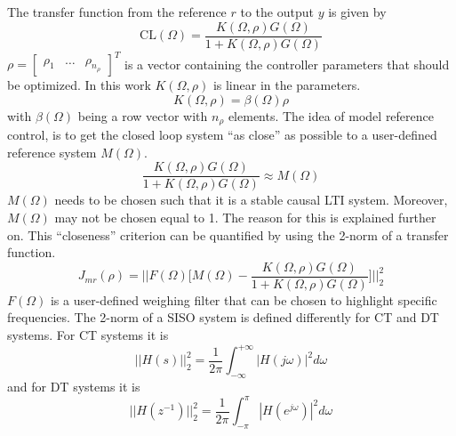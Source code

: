 The transfer function from the reference $r$ to the output $y$ is given by
\begin{equation*}
    \text{CL}(\Omega) = \frac{K(\Omega,\rho) G(\Omega)}{1 + K(\Omega,\rho) G(\Omega)}
\end{equation*}
$\rho = \begin{bmatrix}
        \rho_1 & \ldots & \rho_{n_{\rho}}
\end{bmatrix}^T$ is a vector containing the controller parameters that should be optimized. In this work $K(\Omega,\rho)$ is linear in the parameters.
\begin{equation}
    K(\Omega,\rho) = \beta(\Omega) \rho
    \label{eq:linear_in_the_parameters}
\end{equation}
with $\beta(\Omega)$ being a row vector with $n_\rho$ elements.
The idea of model reference control, is to get the closed loop system ``as close'' as possible to a user-defined reference system $M(\Omega)$.
\begin{equation*}
    \frac{K(\Omega,\rho) G(\Omega)}{1 + K(\Omega,\rho) G(\Omega)} \approx M(\Omega)
\end{equation*}
$M(\Omega)$ needs to be chosen such that it is a stable causal LTI system. Moreover, $M(\Omega)$ may not be chosen equal to 1. The reason for this is explained further on. This ``closeness'' criterion can be quantified by using the 2-norm of a transfer function.
\begin{equation}
    J_{mr}(\rho) =  \Big|\Big|F(\Omega) \Big[M(\Omega)-\frac{K(\Omega,\rho) G(\Omega)}{1 + K(\Omega,\rho) G(\Omega)}\Big]  \Big|\Big|_2^2 
    \label{eq:Jmr}
\end{equation}
$F(\Omega)$ is a user-defined weighing filter that can be chosen to highlight specific frequencies. The 2-norm of a SISO system is defined differently for CT and DT systems. For CT systems it is
\begin{equation*}
    ||H(s)||_2^2 = \frac{1}{2\pi} \int_{-\infty}^{+\infty} |H(j\omega)|^2 d\omega
\end{equation*}
and for DT systems it is
\begin{equation*}
    ||H(z^{-1})||_2^2 = \frac{1}{2\pi} \int_{-\pi}^{\pi} |H(e^{j\omega})|^2 d\omega
\end{equation*}

